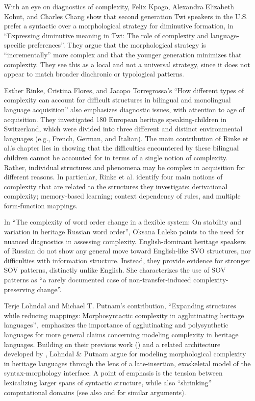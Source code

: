 \documentclass[output=paper,colorlinks,citecolor=brown]{langscibook}
\begin{document}
With an eye on diagnostics of complexity, Felix Kpogo, Alexandra Elizabeth Kohut, and Charles Chang show that second generation Twi speakers in the U.S. prefer a syntactic over a morphological strategy for diminutive formation, in “Expressing diminutive meaning in Twi: The role of complexity and language-specific preferences”. They argue that the morphological strategy is “incrementally” more complex and that the younger generation minimizes that complexity. They see this as a local and not a universal strategy, since it does not appear to match broader diachronic or typological patterns.~

Esther Rinke, Cristina Flores, and Jacopo Torregrossa’s “How different types of complexity can account for difficult structures in bilingual and monolingual language acquisition” also emphasizes diagnostic issues, with attention to age of acquisition. They investigated 180 European heritage speaking-children in Switzerland, which were divided into three different and distinct environmental languages (e.g., French, German, and Italian).  The main contribution of Rinke et al.’s chapter lies in showing that the difficulties encountered by these bilingual children cannot be accounted for in terms of a single notion of complexity. Rather, individual structures and phenomena may be complex in acquisition for different reasons. In particular, Rinke et al. identify four main notions of complexity that are related to the structures they investigate: derivational complexity; memory-based learning; context dependency of rules, and multiple form-function mappings.

In “The complexity of word order change in a flexible system: On stability and variation in heritage Russian word order”, Oksana Laleko points to the need for nuanced diagnostics in assessing complexity. English-dominant heritage speakers of Russian do not show any general move toward English-like SVO structures, nor difficulties with information structure. Instead, they provide evidence for stronger SOV patterns, distinctly unlike English. She characterizes the use of SOV patterns as “a rarely documented case of non-transfer-induced complexity-preserving change”.

\begin{sloppypar}
Terje Lohndal and Michael T. Putnam’s contribution, “Expanding structures while reducing mappings: Morphosyntactic complexity in agglutinating heritage languages”,~emphasizes the importance of agglutinating and polysynthetic languages for more general claims concerning modeling complexity in heritage languages. Building on their previous work (\citealt{LohndalPutnam2021,lohnput24}) and a related architecture developed by \citet{López2020}, Lohndal \& Putnam argue for modeling morphological complexity in heritage languages through the lens of a late-insertion, exoskeletal model of the syntax-morphology interface. A point of emphasis is the tension between lexicalizing larger spans of syntactic structure, while also ``shrinking'' computational domains (see also \citealt{ScontrasEtAl2018} and \citealt{PolinskyScontras2020} for similar arguments). 
\end{sloppypar}
\end{document}
